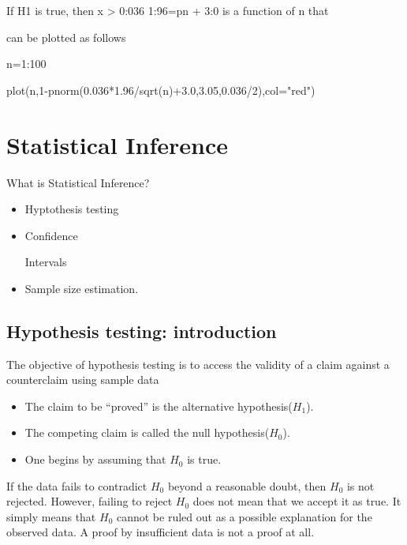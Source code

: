 If H1 is true, then x > 0:036 1:96=pn + 3:0 is a function of n that

can be plotted as follows

n=1:100

plot(n,1-pnorm(0.036*1.96/sqrt(n)+3.0,3.05,0.036/2),col="red")

 



 








 

\section{Statistical Inference} What is Statistical Inference?

\begin{itemize}\item Hyptothesis testing \item Confidence

Intervals \item Sample size estimation.\end{itemize}

 

\subsection{Hypothesis testing: introduction}

The objective of hypothesis testing is to access the validity of a claim against a counterclaim using sample data

\begin{itemize}\item The claim to be “proved” is the alternative hypothesis($H_1$).\item The competing claim is called the null hypothesis($H_0$).\item One begins by assuming that $H_0$ is true. \end{itemize}

 

If the data fails to contradict $H_0$ beyond a reasonable doubt, then $H_0$ is not rejected. However, failing to reject $H_0$ does not mean that we accept it as true. It simply means that $H_0$ cannot be ruled out as a possible explanation for the observed data. A proof by insufficient data is not a proof at all.

